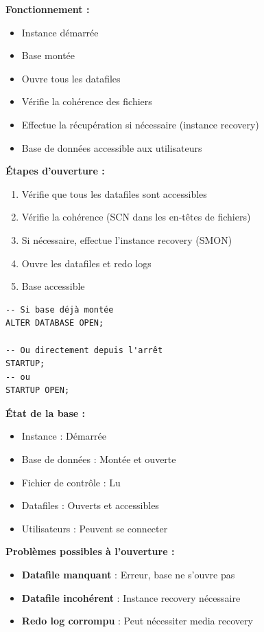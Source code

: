 \documentclass[11pt,a4paper]{article}
\begin{document}
\textbf{Fonctionnement :}
\begin{itemize}
    \item Instance démarrée
    \item Base montée
    \item Ouvre tous les datafiles
    \item Vérifie la cohérence des fichiers
    \item Effectue la récupération si nécessaire (instance recovery)
    \item Base de données accessible aux utilisateurs
\end{itemize}

\textbf{Étapes d'ouverture :}
\begin{enumerate}
    \item Vérifie que tous les datafiles sont accessibles
    \item Vérifie la cohérence (SCN dans les en-têtes de fichiers)
    \item Si nécessaire, effectue l'instance recovery (SMON)
    \item Ouvre les datafiles et redo logs
    \item Base accessible
\end{enumerate}

\begin{commandebox}
\begin{lstlisting}
-- Si base déjà montée
ALTER DATABASE OPEN;

-- Ou directement depuis l'arrêt
STARTUP;
-- ou
STARTUP OPEN;
\end{lstlisting}
\end{commandebox}

\textbf{État de la base :}
\begin{itemize}
    \item Instance : Démarrée
    \item Base de données : Montée et ouverte
    \item Fichier de contrôle : Lu
    \item Datafiles : Ouverts et accessibles
    \item Utilisateurs : Peuvent se connecter
\end{itemize}

\textbf{Problèmes possibles à l'ouverture :}

\begin{itemize}
    \item \textbf{Datafile manquant} : Erreur, base ne s'ouvre pas
    \item \textbf{Datafile incohérent} : Instance recovery nécessaire
    \item \textbf{Redo log corrompu} : Peut nécessiter media recovery
\end{itemize}
\end{document}
